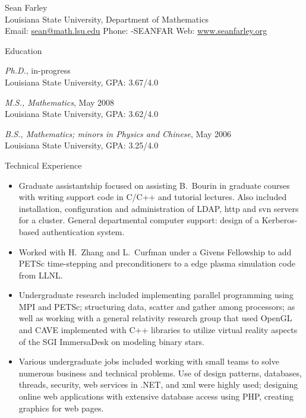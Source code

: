 \documentclass[10pt]{article}
\begin{document}
\newlength{\oldcvlabelwidth}
\newlength{\oldcvlabelsep}

\newcommand{\name}{Sean Farley}
\newcommand{\institute}{Louisiana State University}
\newcommand{\dept}{Department of Mathematics}

\begin{cv}{{\large \name}\\
{\normalsize Louisiana State University, 
Department of Mathematics\\
Email: {\mdseries \href{mailto:sean@math.lsu.edu}
	{sean@math.lsu.edu}} 
\hfill Phone: {-SEANFAR} \hfill 
Web: {\mdseries \href{http://www.seanfarley.org/}
	{www.seanfarley.org}}}
}

\setlength{\oldcvlabelwidth}{\cvlabelwidth}
\setlength{\oldcvlabelsep}{\cvlabelsep}

\setlength{\cvlabelwidth}{1em}

\begin{cvlist}{Education}
	\item \emph{Ph.D.}, in-progress\\
	\institute, GPA: 3.67/4.0
	\item \emph{M.S., Mathematics}, May 2008\\ 
	\institute, GPA: 3.62/4.0
	\item \emph{B.S., Mathematics; minors in Physics and Chinese}, May 2006\\
	\institute, GPA: 3.25/4.0
\end{cvlist}

\setlength{\cvlabelwidth}{0em}
\setlength{\cvlabelsep}{\labelsep}
\begin{cvlist}{Technical Experience}
\item
	\begin{itemize}\itemsep=0.25em
	\item Graduate assistantship focused on assisting B.~Bourin in graduate courses
		with writing support code in C/C++ and tutorial lectures. Also included
		installation, configuration and administration of LDAP, http and svn
		servers for a cluster. General departmental computer support: design of a
		Kerberos-based authentication system.
	\item Worked with H.~Zhang and L.~Curfman under a Givens Fellowship to add
		PETSc time-stepping and preconditioners to a edge plasma simulation code from LLNL.
	\item Undergraduate research included implementing parallel programming using MPI and PETSc;
		structuring data, scatter and gather among processors; as well as working with a general
		relativity research group that used OpenGL and CAVE implemented with C++ libraries to
		utilize virtual reality aspects of the SGI ImmersaDesk on modeling binary stars.
	\item Various undergraduate jobs included working with small teams to solve numerous business
		and technical problems. Use of design patterns, databases, threads, security, web services in .NET,
		and xml were highly used; designing online web applications with extensive database access using PHP,
		creating graphics for web pages.
	\end{itemize}
\end{cvlist}


\end{cv}
\end{document}
